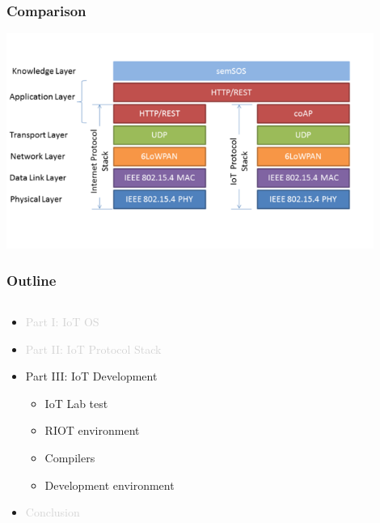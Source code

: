 \documentclass{beamer}
\begin{document}
\begin{frame}
	\frametitle{Comparison}
	\vspace{.5cm}
	\hspace*{.5cm} \includegraphics[width=12cm]{figs/Web-and-IoT-Stacks-2.png}
\end{frame}
\begin{frame}
	\frametitle{Outline}
	\begin{columns}[c]
		\begin{column}{30cm}
			\vspace{.1cm}
			\begin{itemize}
				\justifying
				\item \textcolor{LightGray}{Part I: IoT OS}
				\item \textcolor{LightGray}{Part II: IoT Protocol Stack}
				\item Part III: IoT Development
				\begin{itemize}
					\item IoT Lab test
					\item RIOT environment
					\item Compilers
					\item Development environment
				\end{itemize}
				\item \textcolor{LightGray}{Conclusion}
			\end{itemize}
		\end{column}
	\end{columns}
\end{frame}
\end{document}
